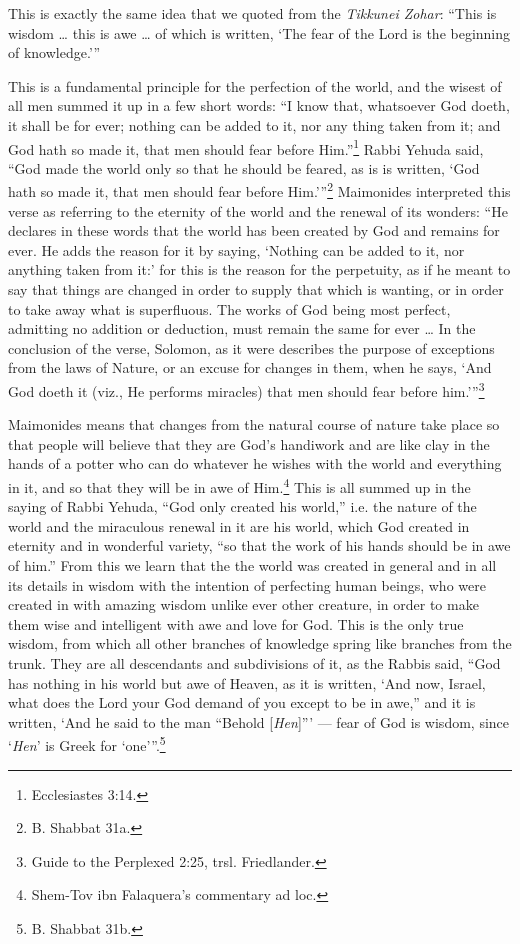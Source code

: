 \documentclass[11pt, a5paper, twoside, chapterprefix, openany]{scrbook}
\begin{document}
This is exactly the same idea that we quoted from the \textit{Tikkunei Zohar}: “This is wisdom … this is awe … of which is written, ‘The fear of the Lord is the beginning of knowledge.’”

This is a fundamental principle for the perfection of the world, and the wisest of all men summed it up in a few short words: “I know that, whatsoever God doeth, it shall be for ever; nothing can be added to it, nor any thing taken from it; and God hath so made it, that men should fear before Him.”\footnote{Ecclesiastes 3:14.} Rabbi Yehuda said, ``God made the world only so that he should be feared, as is is written, `God hath so made it, that men should fear before Him.’”\footnote{B. Shabbat 31a.} Maimonides interpreted this verse as referring to the eternity of the world and the renewal of its wonders: “He declares in these words that the world has been created by God and remains for ever. He adds the reason for it by saying, ‘Nothing can be added to it, nor anything taken from it:’ for this is the reason for the perpetuity, as if he meant to say that things are changed in order to supply that which is wanting, or in order to take away what is superfluous. The works of God being most perfect, admitting no addition or deduction, must remain the same for ever … In the conclusion of the verse, Solomon, as it were describes the purpose of exceptions from the laws of Nature, or an excuse for changes in them, when he says, ‘And God doeth it (viz., He performs miracles) that men should fear before him.’”\footnote{Guide to the Perplexed 2:25, trsl. Friedlander.}

Maimonides means that changes from the natural course of nature take place so that people will believe that they are God’s handiwork and are like clay in the hands of a potter who can do whatever he wishes with the world and everything in it, and so that they will be in awe of Him.\footnote{Shem-Tov ibn Falaquera’s commentary ad loc.} This is all summed up in the saying of Rabbi Yehuda, “God only created his world,” i.e. the nature of the world and the miraculous renewal in it are his world, which God created in eternity and in wonderful variety, “so that the work of his hands should be in awe of him.” From this we learn that the the world was created in general and in all its details in wisdom with the intention of perfecting human beings, who were created in with amazing wisdom unlike ever other creature, in order to make them wise and intelligent with awe and love for God. This is the only true wisdom, from which all other branches of knowledge spring like branches from the trunk. They are all descendants and subdivisions of it, as the Rabbis said, “God has nothing in his world but awe of Heaven, as it is written, ‘And now, Israel, what does the Lord your God demand of you except to be in awe,” and it is written, ‘And he said to the man “Behold [\textit{Hen}]”’ — fear of God is wisdom, since ‘\textit{Hen}’ is Greek for ‘one’”.\footnote{B. Shabbat 31b.}
\end{document}
